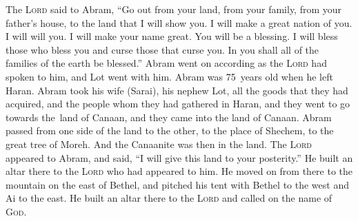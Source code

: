 
\begin{inparaenum}
     The \textsc{Lord} said to Abram, ``Go out from your land, from your family, from your father's house, to the land that I will show you.%
     I will make a great nation of you. I will will you. I will make your name great. You will be a blessing.%
     I will bless those who bless you and curse those that curse you. In you shall all of the families of the earth be blessed.''%
     Abram went on according as the \textsc{Lord} had spoken to him, and Lot went with him. Abram was 75~years old when he left Haran.%
     Abram took his wife (Sarai), his nephew Lot, all the goods that they had acquired, and the people whom they had gathered in Haran, and they went to go towards the\understood\ land of Canaan, and they came into the land of Canaan.%
     Abram passed from one side of the land to the other, to the place of Shechem, to the great tree of Moreh. And the Canaanite was then in the land.%
     The \textsc{Lord} appeared to Abram, and said, ``I will give this land to your posterity.'' He built an altar there to the \textsc{Lord} who had appeared to him.%
     He moved on from there to the mountain on the east of Bethel, and pitched his tent with Bethel to the west and Ai to the east. He built an altar there to the \textsc{Lord} and called on the name of \textsc{God}.%
    
\end{inparaenum}
